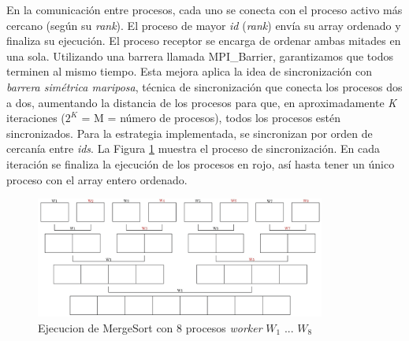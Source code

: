	En la comunicación entre procesos, cada uno se conecta con el proceso activo más cercano (según su \textit{rank}). El proceso de mayor \textit{id} (\textit{rank}) envía su array ordenado y finaliza su ejecución. El proceso receptor se encarga de ordenar ambas mitades en una sola. Utilizando una barrera llamada MPI\_Barrier, garantizamos que todos terminen al mismo tiempo. Esta mejora aplica la idea de sincronización con \textit{barrera simétrica mariposa}, técnica de sincronización que conecta los procesos dos a dos, aumentando la distancia de los procesos para que, en aproximadamente \textit{K} iteraciones (\(2^{K}\) = M = número de procesos), todos los procesos estén sincronizados. Para la estrategia implementada, se sincronizan por orden de cercanía entre \textit{ids}. La Figura \ref{fig:mergesortmpi} muestra el proceso de sincronización. En cada iteración se finaliza la ejecución de los procesos en rojo, así hasta tener un único proceso con el array entero ordenado.  
	
	\vspace{0.2cm}
	
	\begin{figure}[!h]
		\centering
		\includegraphics[width=0.85\textwidth]{images/chapter_3/mergesort_mpi}
		\caption{Ejecucion de MergeSort con 8 procesos \textit{worker} \(W_{1}\) ... \(W_{8}\)}
		\label{fig:mergesortmpi}
	\end{figure}


